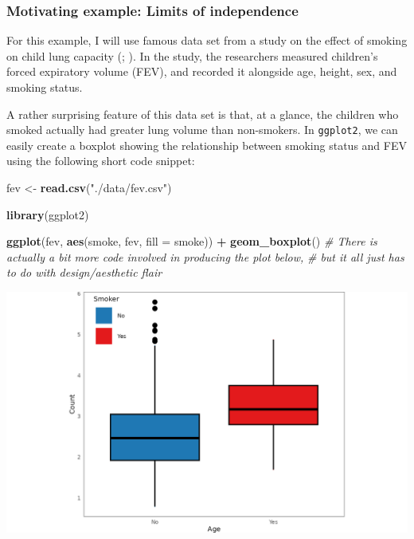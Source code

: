 \documentclass[
]{book}
\newenvironment{Shaded}{\begin{snugshade}}{\end{snugshade}}
\newcommand{\AttributeTok}[1]{\textcolor[rgb]{0.13,0.29,0.53}{#1}}
\newcommand{\CommentTok}[1]{\textcolor[rgb]{0.56,0.35,0.01}{\textit{#1}}}
\newcommand{\FunctionTok}[1]{\textcolor[rgb]{0.13,0.29,0.53}{\textbf{#1}}}
\newcommand{\NormalTok}[1]{#1}
\newcommand{\OtherTok}[1]{\textcolor[rgb]{0.56,0.35,0.01}{#1}}
\newcommand{\SpecialCharTok}[1]{\textcolor[rgb]{0.81,0.36,0.00}{\textbf{#1}}}
\newcommand{\StringTok}[1]{\textcolor[rgb]{0.31,0.60,0.02}{#1}}
\theoremstyle{definition}
\theoremstyle{definition}
\theoremstyle{definition}
\theoremstyle{definition}
\theoremstyle{remark}
\begin{document}
\subsubsection{Motivating example: Limits of independence}\label{stacking-not-graphical}

For this example, I will use famous data set from a study on the effect of smoking on child lung capacity (; ). In the study, the researchers measured children's forced expiratory volume (FEV), and recorded it alongside age, height, sex, and smoking status.

A rather surprising feature of this data set is that, at a glance, the children who smoked actually had greater lung volume than non-smokers. In \texttt{ggplot2}, we can easily create a boxplot showing the relationship between smoking status and FEV using the following short code snippet:

\begin{Shaded}
\begin{Highlighting}[]
\NormalTok{fev }\OtherTok{\textless{}{-}} \FunctionTok{read.csv}\NormalTok{(}\StringTok{"./data/fev.csv"}\NormalTok{)}

\FunctionTok{library}\NormalTok{(ggplot2)}

\FunctionTok{ggplot}\NormalTok{(fev, }\FunctionTok{aes}\NormalTok{(smoke, fev, }\AttributeTok{fill =}\NormalTok{ smoke)) }\SpecialCharTok{+}
  \FunctionTok{geom\_boxplot}\NormalTok{()}
\CommentTok{\# There is actually a bit more code involved in producing the plot below,}
\CommentTok{\# but it all just has to do with design/aesthetic flair}
\end{Highlighting}
\end{Shaded}

\begin{center}\includegraphics[width=1\linewidth,height=1\textheight]{./figures/grammar-boxplot} \end{center}
\end{document}
